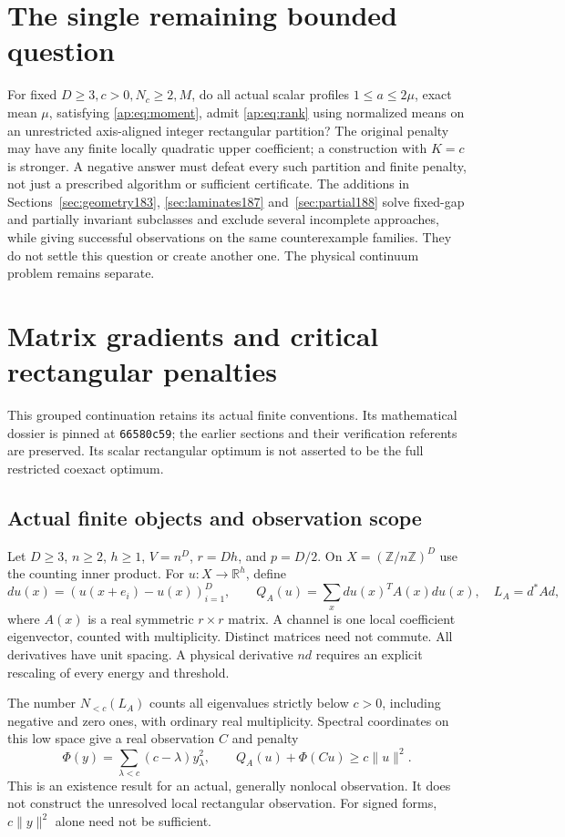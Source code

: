 \documentclass[11pt]{article}
\newcommand{\R}{\mathbb R}
\providecommand{\Nlow}{N_{<c}}
\begin{document}
\section{The single remaining bounded question}
For fixed $D\geq3,c>0,N_c\geq2,M$, do all actual scalar profiles
$1\leq a\leq2\mu$, exact mean $\mu$, satisfying \eqref{ap:eq:moment}, admit
\eqref{ap:eq:rank} using normalized means on an unrestricted axis-aligned
integer rectangular partition? The original penalty may have any finite
locally quadratic upper coefficient; a construction with $K=c$ is stronger.
A negative answer must defeat every such partition and finite penalty,
not just a prescribed algorithm or sufficient certificate. The additions
in Sections~\ref{sec:geometry183}, \ref{sec:laminates187} and~\ref{sec:partial188} solve fixed-gap and partially invariant subclasses and exclude
several incomplete approaches, while giving successful observations on
the same counterexample families. They do not settle this question or
create another one. The physical continuum problem remains separate.

\clearpage
\section{Matrix gradients and critical rectangular penalties}\label{sec:matrix-continuation}
This grouped continuation retains its actual finite conventions. Its mathematical dossier is pinned at \texttt{66580c59}; the earlier sections and their verification referents are preserved. Its scalar rectangular optimum is not asserted to be the full restricted coexact optimum.
\subsection{Actual finite objects and observation scope}
Let $D\geq3$, $n\geq2$, $h\geq1$, $V=n^D$, $r=Dh$, and $p=D/2$.
On $X=(\mathbb Z/n\mathbb Z)^D$ use the counting inner product. For
$u:X\to\R^h$, define
\[
 du(x)=(u(x+e_i)-u(x))_{i=1}^D,\qquad
 Q_A(u)=\sum_x du(x)^T A(x)du(x),\quad L_A=d^*A d,
\]
where $A(x)$ is a real symmetric $r\times r$ matrix. A channel is one local
coefficient eigenvector, counted with multiplicity. Distinct matrices need
not commute. All derivatives have unit spacing. A physical derivative $nd$
requires an explicit rescaling of every energy and threshold.

The number $\Nlow(L_A)$ counts all eigenvalues strictly below $c>0$,
including negative and zero ones, with ordinary real multiplicity. Spectral
coordinates on this low space give a real observation $C$ and penalty
\begin{equation}\label{mx:eq:penalty}
 \Phi(y)=\sum_{\lambda<c}(c-\lambda)y_\lambda^2,
 \qquad Q_A(u)+\Phi(Cu)\geq c\|u\|^2.
\end{equation}
This is an existence result for an actual, generally nonlocal observation.
It does not construct the unresolved local rectangular observation.
For signed forms, $c\|y\|^2$ alone need not be sufficient.
\end{document}
